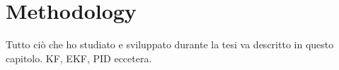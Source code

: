 \chapter{Methodology}
\label{chap:third}
\ifpdf
    \graphicspath{{Chapter3/Figures/PNG/}{Chapter3/Figures/PDF/}{Chapter3/Figures/}{Chapter3/Figures/EPS/}}
\else
    \graphicspath{{Chapter3/Figures/EPS/}{Chapter3/Figures/}}
\fi

Tutto ciò che ho studiato e sviluppato durante la tesi va descritto in questo capitolo.
KF, EKF, PID eccetera.
